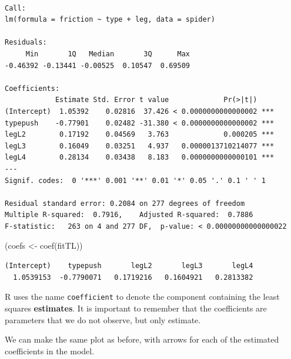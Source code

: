 \documentclass[
  letterpaper,
  DIV=11,
  numbers=noendperiod]{scrartcl}
\newenvironment{Shaded}{\begin{snugshade}}{\end{snugshade}}
\newcommand{\FunctionTok}[1]{\textcolor[rgb]{0.28,0.35,0.67}{#1}}
\newcommand{\NormalTok}[1]{\textcolor[rgb]{0.00,0.23,0.31}{#1}}
\newcommand{\OtherTok}[1]{\textcolor[rgb]{0.00,0.23,0.31}{#1}}
\begin{document}
\begin{verbatim}

Call:
lm(formula = friction ~ type + leg, data = spider)

Residuals:
     Min       1Q   Median       3Q      Max 
-0.46392 -0.13441 -0.00525  0.10547  0.69509 

Coefficients:
            Estimate Std. Error t value             Pr(>|t|)    
(Intercept)  1.05392    0.02816  37.426 < 0.0000000000000002 ***
typepush    -0.77901    0.02482 -31.380 < 0.0000000000000002 ***
legL2        0.17192    0.04569   3.763             0.000205 ***
legL3        0.16049    0.03251   4.937   0.0000013710214077 ***
legL4        0.28134    0.03438   8.183   0.0000000000000101 ***
---
Signif. codes:  0 '***' 0.001 '**' 0.01 '*' 0.05 '.' 0.1 ' ' 1

Residual standard error: 0.2084 on 277 degrees of freedom
Multiple R-squared:  0.7916,    Adjusted R-squared:  0.7886 
F-statistic:   263 on 4 and 277 DF,  p-value: < 0.00000000000000022
\end{verbatim}

\begin{Shaded}
\begin{Highlighting}[]
\NormalTok{(coefs }\OtherTok{\textless{}{-}} \FunctionTok{coef}\NormalTok{(fitTL))}
\end{Highlighting}
\end{Shaded}

\begin{verbatim}
(Intercept)    typepush       legL2       legL3       legL4 
  1.0539153  -0.7790071   0.1719216   0.1604921   0.2813382 
\end{verbatim}

R uses the name \texttt{coefficient} to denote the component containing
the least squares \textbf{estimates}. It is important to remember that
the coefficients are parameters that we do not observe, but only
estimate.

We can make the same plot as before, with arrows for each of the
estimated coefficients in the model.
\end{document}
